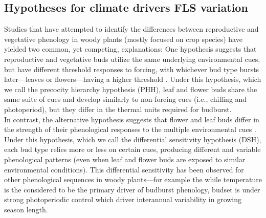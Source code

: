 \documentclass[11pt]{article}
\begin{document}
\subsection*{Hypotheses for climate drivers FLS variation} %
\noindent Studies that have attempted to identify the differences between reproductive and vegetative phenology in woody plants (mostly focused on crop species) have yielded two common, yet competing, explanations:
\noindent One hypothesis suggests that reproductive and vegetative buds utilize the same underlying environmental cues, but have different threshold responses to forcing, with whichever bud type bursts later---leaves or flowers---having a higher threshold \citep{Guo2014,COSMULESCU:2020aa,Cosmulescu:2018aa}. Under this hypothesis, which we call the precocity hierarchy hypothesis (PHH), leaf and flower buds share the same suite of cues and develop similarly to non-forcing cues (i.e., chilling and photoperiod), but they differ in the thermal units required for budburst.\\ %

\noindent In contrast, the alternative hypothesis suggests that flower and leaf buds differ in the strength of their phenological responses to the multiple environmental cues \citep{Citadin2001,Gariglio2006,Aslani2009,Mehlenbacher:1991aa}. Under this hypothesis, which we call the differential sensitivity hypothesis (DSH), each bud type relies more or less on certain cues, producing different and variable phenological patterns (even when leaf and flower buds are exposed to similar environmental conditions). This differential sensitivity has been observed for other phenological sequences in woody plants---for example the while temperature is the considered to be the primary driver of budburst phenology, budset is under strong photoperiodic control \citep{} which driver interannual variability in growing season length.\\ %
\end{document}
